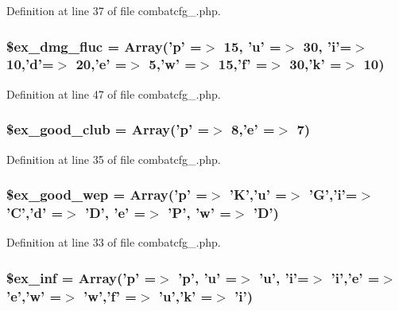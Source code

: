 Definition at line 37 of file combatcfg\+\_.\+php.

\hypertarget{combatcfg__1_8php_a681401195cdfc0e0c016c1550ffee021}{
\subsubsection[{\$ex\+\_\+dmg\+\_\+fluc}]{\setlength{\rightskip}{0pt plus 5cm}\$ex\+\_\+dmg\+\_\+fluc = Array('p' =$>$ 15, 'u' =$>$ 30, 'i'=$>$ 10,'d'=$>$ 20,'e' =$>$ 5,'w' =$>$ 15,'f' =$>$ 30,'k' =$>$ 10)}}\label{combatcfg__1_8php_a681401195cdfc0e0c016c1550ffee021}


Definition at line 47 of file combatcfg\+\_.\+php.

\hypertarget{combatcfg__1_8php_a225b842cab48d7ce2dfbb0e305f9367f}{
\subsubsection[{\$ex\+\_\+good\+\_\+club}]{\setlength{\rightskip}{0pt plus 5cm}\$ex\+\_\+good\+\_\+club = Array('p' =$>$ 8,'e' =$>$ 7)}}\label{combatcfg__1_8php_a225b842cab48d7ce2dfbb0e305f9367f}


Definition at line 35 of file combatcfg\+\_.\+php.

\hypertarget{combatcfg__1_8php_ad37de0fa5f7269157c4345e379d92128}{
\subsubsection[{\$ex\+\_\+good\+\_\+wep}]{\setlength{\rightskip}{0pt plus 5cm}\$ex\+\_\+good\+\_\+wep = Array('p' =$>$ 'K','u' =$>$ 'G','i'=$>$ 'C','d' =$>$ 'D', 'e' =$>$ 'P', 'w' =$>$ 'D')}}\label{combatcfg__1_8php_ad37de0fa5f7269157c4345e379d92128}


Definition at line 33 of file combatcfg\+\_.\+php.

\hypertarget{combatcfg__1_8php_a74c8d5942be03934eeb8801ec6cfc727}{
\subsubsection[{\$ex\+\_\+inf}]{\setlength{\rightskip}{0pt plus 5cm}\$ex\+\_\+inf = Array('p' =$>$ 'p', 'u' =$>$ 'u', 'i'=$>$ 'i','e' =$>$ 'e','w' =$>$ 'w','f' =$>$ 'u','k' =$>$ 'i')}}\label{combatcfg__1_8php_a74c8d5942be03934eeb8801ec6cfc727}


